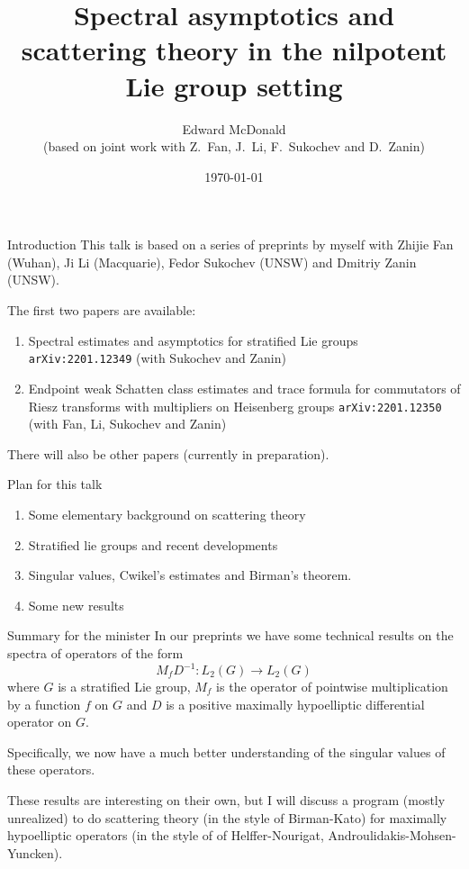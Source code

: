 \documentclass{beamer}
\date{\today}
\newcommand\makebeamertitle{\frame{\maketitle}}%
\numberwithin{equation}{section}
\theoremstyle{plain}
\theoremstyle{plain}
\theoremstyle{definition}
\theoremstyle{plain}
\theoremstyle{plain}
\theoremstyle{definition}
\begin{document}
\title[Spectral asymptotics and nilpotent Lie groups]{Spectral asymptotics and scattering theory in the nilpotent Lie group setting}


\author[E. McDonald]{Edward McDonald\\
(based on joint work with  Z.~Fan, J.~Li, F.~Sukochev and D.~Zanin)}



\makebeamertitle

\begin{frame}{Introduction}
    This talk is based on a series of preprints by myself with Zhijie Fan (Wuhan), Ji Li (Macquarie), Fedor Sukochev (UNSW) and Dmitriy Zanin (UNSW). 
    
    The first two papers are available:
    \begin{enumerate}[{\rm (a)}]
      \item{} Spectral estimates and asymptotics for stratified Lie groups \texttt{arXiv:2201.12349} (with Sukochev and Zanin)
      \item{} Endpoint weak Schatten class estimates and trace formula for commutators of Riesz transforms with multipliers on Heisenberg groups \texttt{arXiv:2201.12350} (with Fan, Li, Sukochev and Zanin) 
    \end{enumerate}
    There will also be other papers (currently in preparation).
\end{frame}

\begin{frame}{Plan for this talk}
    \begin{enumerate}
        \item{} Some elementary background on scattering theory
        \item{} Stratified lie groups and recent developments
        \item{} Singular values, Cwikel's estimates and Birman's theorem.
        \item{} Some new results
    \end{enumerate}
\end{frame}

\begin{frame}{Summary for the minister}
  In our preprints we have some technical results on the spectra of operators of the form
  \[
    M_f D^{-1}:L_2(G)\to L_2(G)
  \]
  where $G$ is a stratified Lie group, $M_f$ is the operator of pointwise multiplication by a function $f$ on $G$ and $D$ is a positive maximally hypoelliptic differential operator on $G.$

  Specifically, we now have a much better understanding of the singular values of these operators.
  \pause

  These results are interesting on their own, but I will discuss a program (mostly unrealized) to do scattering theory (in the style of Birman-Kato) for maximally hypoelliptic operators (in the style of of Helffer-Nourigat, Androulidakis-Mohsen-Yuncken).
\end{frame}
\end{document}
